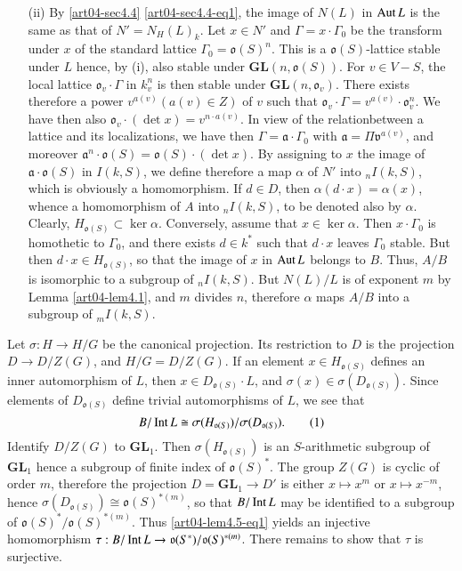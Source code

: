 \begin{itemize}
\item[(ii)] By \ref{art04-sec4.4} \eqref{art04-sec4.4-eq1}, the image of $N(L)$ in $\operatorname{\mathrm{Aut}} L$ is the same as that of $N'=N_{H}(L)_{k}$. Let $x\in N'$ and $\Gamma=x\cdot \Gamma_{0}$ be the transform under $x$ of the standard lattice $\Gamma_{0}=\mathfrak{o}(S)^{n}$. This is a $\mathfrak{o}(S)$-lattice stable under $L$ hence, by (i), also stable under $\mathbf{GL}(n,\mathfrak{o}(S))$. For $v\in V-S$, the local lattice $\mathfrak{o}_{v}\cdot \Gamma$ in $k^{n}_{v}$ is then stable under $\mathbf{GL}(n,\mathfrak{o}_{v})$. There exists therefore a power $v^{a(v)}(a(v)\in Z)$ of $v$ such that $\mathfrak{o}_{v}\cdot \Gamma=v^{a(v)}\cdot \mathfrak{o}^{n}_{v}$. We have then also $\mathfrak{o}_{v}\cdot (\det x)=v^{n\cdot a(v)}$. In view of the relation\pageoriginale between a lattice and its localizations, we have then $\Gamma=\mathfrak{a}\cdot \Gamma_{0}$ with $\mathfrak{a}=\Pi \mathfrak{v}^{a(v)}$, and moreover $\mathfrak{a}^{n}\cdot \mathfrak{o}(S)=\mathfrak{o}(S)\cdot (\det x)$. By assigning to $x$ the image of $\mathfrak{a}\cdot \mathfrak{o}(S)$ in $I(k,S)$, we define therefore a map $\alpha$ of $N'$ into ${}_{n}I(k,S)$, which is obviously a homomorphism. If $d\in D$, then $\alpha(d\cdot x)=\alpha(x)$, whence a homomorphism of $A$ into ${}_{n}I(k,S)$, to be denoted also by $\alpha$. Clearly, $H_{\mathfrak{o}(S)}\subset \ker \alpha$. Conversely, assume that $x\in\ker \alpha$. Then $x\cdot \Gamma_{0}$ is homothetic to $\Gamma_{0}$, and there exists $d\in k^{*}$ such that $d\cdot x$ leaves $\Gamma_{0}$ stable. But then $d\cdot x\in H_{\mathfrak{o}(S)}$, so that the image of $x$ in $\operatorname{\mathrm{Aut}} L$ belongs to $B$. Thus, $A/B$ is isomorphic to a subgroup of ${}_{n}I(k,S)$. But $N(L)/L$ is of exponent $m$ by Lemma \ref{art04-lem4.1}, and $m$ divides $n$, therefore $\alpha$ maps $A/B$ into a subgroup of ${}_{m}I(k,S)$.
\end{itemize}

Let $\sigma:H\to H/G$ be the canonical projection. Its restriction to $D$ is the projection $D\to D/Z(G)$, and $H/G=D/Z(G)$. If an element $x\in H_{\mathfrak{o}(S)}$ defines an inner automorphism of $L$, then $x\in D_{\mathfrak{o}(S)}\cdot L$, and $\sigma(x)\in \sigma(D_{\mathfrak{o}(S)})$. Since elements of $D_{\mathfrak{o}(S)}$ define trivial automorphisms of $L$, we see that
\begin{equation*}
B/\operatorname{\mathrm{Int}} L\cong \sigma (H_{\mathfrak{o}(S)})/\sigma(D_{\mathfrak{o}(S)}).\tag{1}\label{art04-lem4.5-eq1}
\end{equation*}
Identify $D/Z(G)$ to $\mathbf{GL}_{1}$. Then $\sigma(H_{\mathfrak{o}(S)})$ is an $S$-arithmetic subgroup of $\mathbf{GL}_{1}$ hence a subgroup of finite index of $\mathfrak{o}(S)^{*}$. The group $Z(G)$ is cyclic of order $m$, therefore the projection $D=\mathbf{GL}_{1}\to D'$ is either $x\mapsto x^{m}$ or $x\mapsto x^{-m}$, hence $\sigma(D_{\mathfrak{o}(S)})\cong \mathfrak{o}(S)^{*(m)}$, so that $B/\operatorname{\mathrm{Int}} L$ may be identified to a subgroup of $\mathfrak{o}(S)^{*}/\mathfrak{o}(S)^{*(m)}$. Thus \eqref{art04-lem4.5-eq1} yields an injective homomorphism $\tau : B/\operatorname{\mathrm{Int}} L\to \mathfrak{o}(S^{*})/\mathfrak{o}(S)^{*(m)}$. There remains to show that $\tau$ is surjective.

